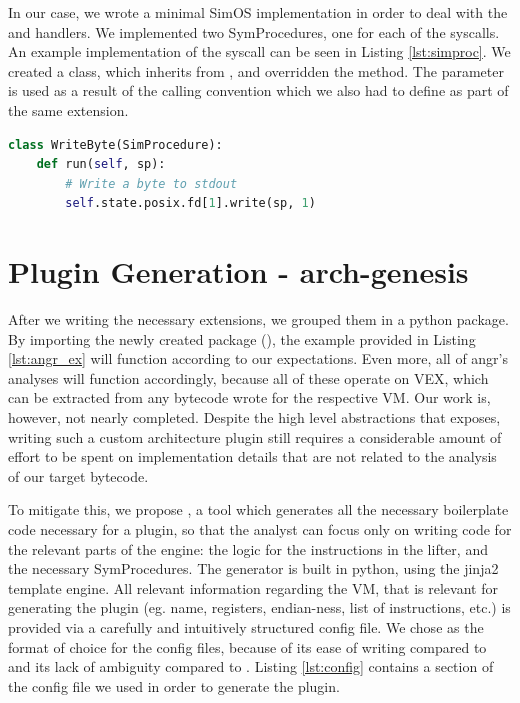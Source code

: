 In our case, we wrote a minimal SimOS implementation in order to deal with the  and  handlers. We implemented two SymProcedures, one for each of the \glspl{syscall}. An example implementation of the  \gls{syscall} can be seen in Listing \ref{lst:simproc}. We created a class, which inherits from , and overridden the  method. The parameter  is used as a result of the calling convention which we also had to define as part of the same extension.

\begin{lstlisting}[language=python, label={lst:simproc}, caption={TODO}]
class WriteByte(SimProcedure):
    def run(self, sp):
        # Write a byte to stdout
        self.state.posix.fd[1].write(sp, 1) 
\end{lstlisting}

\section{Plugin Generation - arch-genesis}

After we writing the necessary extensions, we grouped them in a python package. By importing the newly created package (), the example provided in Listing \ref{lst:angr_ex} will function according to our expectations. Even more, all of angr's analyses will function accordingly, because all of these operate on VEX, which can be extracted from any bytecode wrote for the respective \gls{VM}. Our work is, however, not nearly completed. Despite the high level abstractions that  exposes, writing such a custom architecture plugin still requires a considerable amount of effort to be spent on implementation details that are not related to the analysis of our target bytecode.

To mitigate this, we propose , a tool which generates all the necessary boilerplate code necessary for a plugin, so that the analyst can focus only on writing code for the relevant parts of the engine: the logic for the instructions in the lifter, and the necessary SymProcedures. The generator is built in python, using the jinja2 \cite{jinja} template engine. All relevant information regarding the \gls{VM}, that is relevant for generating the plugin (eg. name, registers, endian-ness, list of instructions, etc.) is provided via a carefully and intuitively structured config file. We chose  \cite{toml} as the format of choice for the config files, because of its ease of writing compared to  and its lack of ambiguity compared to . Listing \ref{lst:config} contains a section of the config file we used in order to generate the  plugin.

